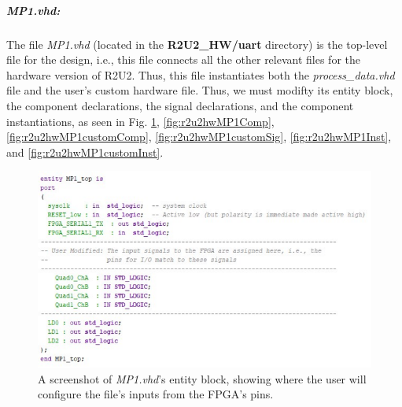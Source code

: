 \subparagraph{MP1.vhd:} The file \textit{MP1.vhd} (located in the \textbf{R2U2\_HW/uart} directory) is the top-level file for the design, i.e., this file connects all the other relevant files for the hardware version of R2U2. Thus, this file instantiates both the \textit{process\_data.vhd} file and the user's custom hardware file. Thus, we must modifty its entity block, the component declarations, the signal declarations, and the component instantiations, as seen in Fig. \ref{fig:r2u2hwMP1Ent}, \ref{fig:r2u2hwMP1Comp}, \ref{fig:r2u2hwMP1customComp}, \ref{fig:r2u2hwMP1customSig}, \ref{fig:r2u2hwMP1Inst}, and \ref{fig:r2u2hwMP1customInst}. 

\begin{figure}[H]
	\begin{center}
	\includegraphics[scale=0.5]{fig/r2u2_hw_mp1_entity.pdf}
	\caption{A screenshot of \textit{MP1.vhd}'s entity block, showing where the user will configure the file's inputs from the FPGA's pins.
	\label{fig:r2u2hwMP1Ent}} 
	\end{center}
\end{figure}

